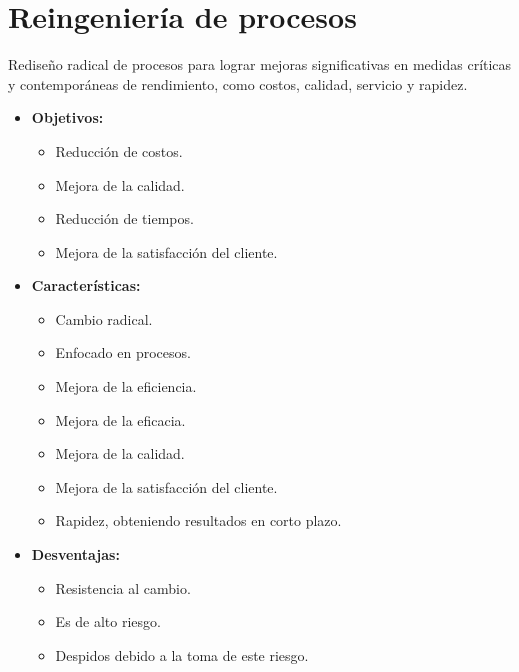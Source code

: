 \documentclass{templateNote}
\begin{document}
\section{Reingeniería de procesos}
\noindent Rediseño radical de procesos para lograr mejoras significativas en medidas críticas y contemporáneas de rendimiento, como costos, calidad, servicio y rapidez.
\begin{itemize}
    \item \textbf{Objetivos:}
    \begin{itemize}
        \item Reducción de costos.
        \item Mejora de la calidad.
        \item Reducción de tiempos.
        \item Mejora de la satisfacción del cliente.
    \end{itemize}
    \item \textbf{Características:}
    \begin{itemize}
        \item Cambio radical.
        \item Enfocado en procesos.
        \item Mejora de la eficiencia.
        \item Mejora de la eficacia.
        \item Mejora de la calidad.
        \item Mejora de la satisfacción del cliente.
        \item Rapidez, obteniendo resultados en corto plazo.
    \end{itemize}
    \item \textbf{Desventajas:}
    \begin{itemize}
        \item Resistencia al cambio.
        \item Es de alto riesgo.
        \item Despidos debido a la toma de este riesgo.
    \end{itemize}
\end{itemize}
\end{document}
